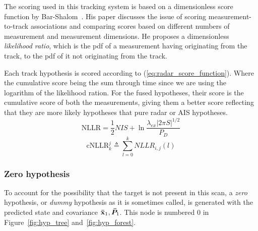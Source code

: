 The scoring used in this tracking system is based on a dimensionless score function by Bar-Shalom~\cite{Bar-Shalom2007}. His paper discusses the issue of scoring measurement-to-track associations and comparing scores based on different numbers of measurement and measurement dimensions. He proposes a dimensionless \emph{likelihood ratio}, which is the \gls{pdf} of a measurement having originating from the track, to the \gls{pdf} of it not originating from the track.

Each \gls{track hypothesis} is scored according to (\ref{eq:radar_score_function}). Where the cumulative score being the sum through time since we are using the logarithm of the likelihood ration. For the fused hypotheses, their score is the cumulative score of both the measurements, giving them a better score reflecting that they are more likely hypotheses that pure radar or AIS hypotheses. 
\begin{equation}\label{eq:radar_score_function}
\mathrm{NLLR} = \frac{1}{2} NIS + \ln \frac{\lambda_{ex} |2 \pi S|^{1/2}} {P_D}		
\end{equation}
\begin{equation}
\mathrm{cNLLR}_k^j \triangleq \sum_{l=0}^k NLLR_{i,j}(l)
\end{equation}

\subsubsection{Zero hypothesis}
To account for the possibility that the target is not present in this scan, a \emph{zero} hypothesis, or \emph{dummy} hypothesis as it is sometimes called, is generated with the predicted state and covariance \(\boldsymbol{\mathbf{\bar{x}}}_1, \bm{\bar{P}}_1\). This node is numbered 0 in Figure~\ref{fig:hyp_tree} and~\ref{fig:hyp_forest}.

